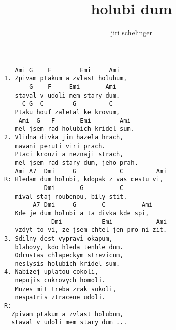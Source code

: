 \author{jiri schelinger}
\title{holubi dum}
\maketitle
\begin{verbatim}
   Ami G    F        Emi     Ami 
1. Zpivam ptakum a zvlast holubum, 
       G    F     Emi       Ami 
   staval v udoli mem stary dum. 
     C G  C        G         C 
   Ptaku houf zaletal ke krovum, 
    Ami  G   F       Emi        Ami 
   mel jsem rad holubich kridel sum. 
2. Vlidna divka jim hazela hrach, 
   mavani peruti viri prach. 
   Ptaci krouzi a neznaji strach, 
   mel jsem rad stary dum, jeho prah. 
   Ami A7  Dmi     G            C         Ami 
R: Hledam dum holubi, kdopak z vas cestu vi, 
           Dmi       G          C 
   mival staj roubenou, bily stit. 
        A7 Dmi     G       C          Ami 
   Kde je dum holubi a ta divka kde spi, 
             Dmi           Emi            Ami 
   vzdyt to vi, ze jsem chtel jen pro ni zit. 
3. Sdilny dest vypravi okapum, 
   blahovy, kdo hleda tenhle dum. 
   Odrustas chlapeckym strevicum, 
   neslysis holubich kridel sum. 
4. Nabizej uplatou cokoli, 
   nepojis cukrovych homoli. 
   Muzes mit treba zrak sokoli, 
   nespatris ztracene udoli. 
R: 
  Zpivam ptakum a zvlast holubum, 
  staval v udoli mem stary dum ... 
\end{verbatim}